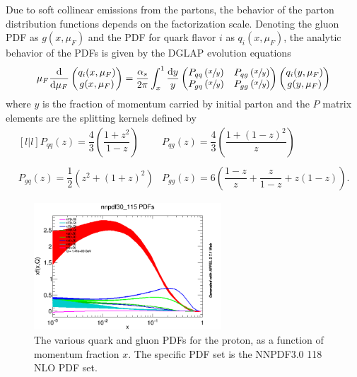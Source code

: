 Due to soft collinear emissions from the partons, the behavior of the parton distribution functions depends on the factorization scale.
Denoting the gluon PDF as $g(x, \mu_F)$ and the PDF for quark flavor $i$ as $q_i(x, \mu_F)$, the analytic behavior of the PDFs is given by the DGLAP evolution equations
\begin{equation}
  \mu_F \frac{\text{d}}{\text{d} \mu_F} \begin{pmatrix} q_i(x, \mu_F) \\ g(x, \mu_F) \end{pmatrix}
  = \frac{\alpha_s}{2\pi} \int_{x}^{1} \frac{\text{d}y}{y}
  \begin{pmatrix}
     P_{qq}\left(\sfrac{x}{y}\right) &  P_{qg}\left(\sfrac{x}{y}\right) \\
     P_{gq}\left(\sfrac{x}{y}\right) &  P_{gg}\left(\sfrac{x}{y}\right) 
  \end{pmatrix}
    \begin{pmatrix} q_i(y, \mu_F) \\ g(y, \mu_F) \end{pmatrix}
\end{equation}
where $y$ is the fraction of momentum carried by initial parton and the $P$ matrix elements are the splitting kernels defined by
\begin{equation}
  \begin{matrix}[l | l]
    P_{qq}(z) = \dfrac{4}{3} \left( \dfrac{1+z^2}{1-z} \right)
    & P_{qg}(z) = \dfrac{4}{3} \left( \dfrac{1+(1-z)^2}{z} \right)
    \\ \\ P_{gq}(z) = \dfrac{1}{2} \left( z^2 + (1+z)^2 \right)
    & P_{gg}(z) = 6 \left( \dfrac{1-z}{z} + \dfrac{z}{1-z} + z(1-z) \right) .
  \end{matrix}
\end{equation}

\begin{figure}[htbp]
  \centering
  \includegraphics[width=0.625\textwidth]{Collider/Figures/nnpdf30_115_test.png}
  \caption{
    The various quark and gluon PDFs for the proton, as a function of momentum fraction $x$.
    The specific PDF set is the NNPDF3.0 118 NLO PDF set.
  }
  \label{fig:nnpdf}
\end{figure}

